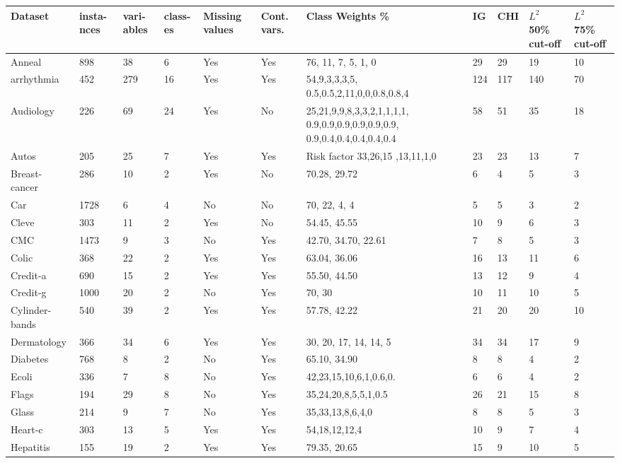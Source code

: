 \documentclass[review]{elsarticle}
\begin{document}
\begin{table}[tp]
\begin{tabular}{|p{1.7cm}|p{0.6cm}|p{0.7cm}|p{0.6cm}|p{0.7cm}|p{0.7cm}|L|p{0.5cm}|p{0.5cm}|p{1cm}|p{1cm}|}
\hline Dataset & insta-nces & vari-ables & class-es & Missing values & Cont. vars. & Class Weights \% & IG & CHI & $ L^2 $ 50\% cut-off  & $ L^2 $ 75\% cut-off \\ 
	\hline Anneal & 898 & 38 & 6 & Yes & Yes & 76,  11, 7, 5, 1, 0 & 29 & 29 & 19 & 10 \\ 
	\hline arrhythmia & 452 & 279 & 16 & Yes & Yes & 54,9,3,3,3,5, 0.5,0.5,2,11,0,0,0.8,0.8,4 & 124 & 117 & 140 & 70 \\ 
\hline Audiology & 226 & 69 & 24 & Yes & No & 25,21,9,9,8,3,3,2,1,1,1,1, 0.9,0.9,0.9,0.9,0.9,0.9, 0.9,0.4,0.4,0.4,0.4,0.4 & 58 & 51 & 35 & 18 \\ 
\hline Autos & 205 & 25 & 7 & Yes & Yes & Risk factor 33,26,15 ,13,11,1,0 & 23 & 23 & 13 & 7 \\ 
\hline Breast-cancer & 286 & 10 & 2 & Yes & No & 70.28, 29.72 & 6 & 4 & 5 & 3 \\ 
\hline Car & 1728 & 6 & 4 & No & No & 70,  22, 4, 4 & 5 & 5 & 3 & 2 \\ 
\hline Cleve & 303 & 11 & 2 & Yes & No & 54.45, 45.55 & 10 & 9 & 6 & 3 \\ 
\hline CMC & 1473 & 9 & 3 & No & Yes & 42.70, 34.70, 22.61  & 7 & 8 & 5 & 3 \\ 
\hline Colic & 368 & 22 & 2 & Yes & Yes & 63.04, 36.06 & 16 & 13 & 11 & 6 \\ 
\hline Credit-a & 690 & 15 & 2 & Yes & Yes & 55.50, 44.50 & 13 & 12 & 9 & 4 \\ 
\hline Credit-g & 1000 & 20 & 2 & No & Yes & 70, 30 & 10 & 11 & 10 & 5 \\
\hline Cylinder-bands & 540 & 39 & 2 & Yes & Yes & 57.78, 42.22 & 21 & 20 & 20 & 10 \\ 
\hline Dermatology & 366 & 34 & 6 & Yes & Yes & 30, 20, 17, 14, 14, 5 &  34 & 34 & 17 & 9 \\
\hline Diabetes & 768 & 8 & 2 & No & Yes & 65.10, 34.90 & 8 & 8 & 4 & 2 \\
\hline Ecoli & 336 & 7 & 8 & No & Yes & 42,23,15,10,6,1,0.6,0. & 6 & 6 & 4 & 2 \\ 
\hline Flags & 194 & 29 & 8 & No & Yes & 35,24,20,8,5,5,1,0.5 & 26 & 21 & 15 & 8 \\ 
\hline Glass & 214 & 9 & 7 & No & Yes & 35,33,13,8,6,4,0 & 8 & 8 & 5 & 3 \\ 
\hline Heart-c & 303 & 13 & 5 & Yes & Yes & 54,18,12,12,4 & 10 & 9 & 7 & 4 \\ 
\hline Hepatitis & 155 & 19 & 2 & Yes & Yes & 79.35, 20.65 & 15 & 9 & 10 & 5 \\ 

\end{tabular}
\end{table}
\end{document}
